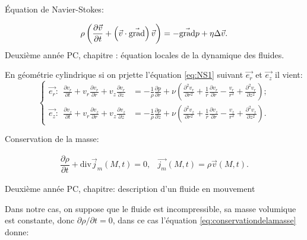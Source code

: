 \documentclass[french, 10pt]{article}
\begin{document}
\begin{Programme}{Équation de Navier-Stokes:}
  
  \begin{equation}
    \rho\left(\dfrac{\partial \vec{v}}{\partial t}+\left(\vec{v}\cdot\vec{\rm grad}\right)\vec{v}\right)=-\vec{\rm grad}p+\eta\Delta\vec{v}.\label{eq:NS1}
  \end{equation}
  Deuxième année PC, chapitre : équation locales de la dynamique des fluides.
\end{Programme}

En géométrie cylindrique si on prjette l'équation \eqref{eq:NS1} suivant $\vec{e_r}$ et $\vec{e_z}$ il vient: 
% 
\begin{equation}
  \left\{
    \begin{aligned}
      \vec{e_r}:~~ \frac{\partial v_r}{\partial t} +v_r\frac{\partial v_r}{\partial r} + v_z\frac{\partial v_r}{\partial z}&= -\frac{1}{\rho}\frac{\partial p}{\partial r} + \nu\left(\frac{\partial^2v_r}{\partial r^2}+ \frac{1}{r}\frac{\partial v_r}{\partial r} - \frac{v_r}{r^2}+\frac{\partial ^2 v_r}{\partial z^2}\right);\\
      \vec{e_z}:~~\frac{\partial v_z}{\partial t} +v_r\frac{\partial v_z}{\partial r} + v_z\frac{\partial v_z}{\partial z} &= -\frac{1}{\rho}\frac{\partial p}{\partial z} + \nu\left(\frac{\partial^2v_z}{\partial r^2}+ \frac{1}{r}\frac{\partial v_z}{\partial r} - \frac{v_z}{r^2}+\frac{\partial ^2 v_z}{\partial z^2}\right).\label{eq:NavierStokes}
   \end{aligned}
  \right.
\end{equation}

\begin{Programme}{Conservation de la masse:}
  
  \begin{equation}
    \begin{array}{cc}
   \dfrac{\partial \rho}{\partial t}+\text{div}\vec{j}_m(M,t)=0, & \vec{j_m}(M,t) = \rho \vec{v}(M,t).\label{eq:conservationdelamasse}
    \end{array}
  \end{equation}

  Deuxième année PC, chapitre: description d'un fluide en mouvement
\end{Programme}

Dans notre cas, on suppose que le fluide est incompressible, sa masse volumique est constante, donc $\partial \rho/\partial t = 0$, dans ce cas l'équation \eqref{eq:conservationdelamasse} donne:
\end{document}
